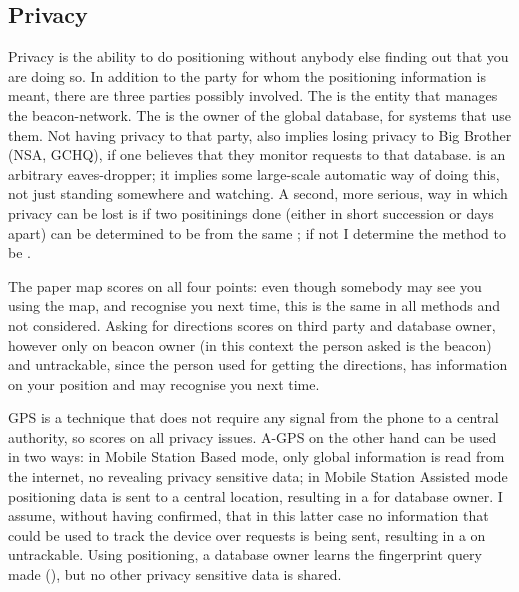 \subsection{Privacy}
Privacy is the ability to do positioning without anybody else finding out that you are doing so.
In addition to the party for whom the positioning information is meant, there are three parties possibly involved.
The  is the entity that manages the beacon-network.
The  is the owner of the global database, for systems that use them.
Not having privacy to that party, also implies losing privacy to Big Brother (NSA, GCHQ), if one believes that they monitor requests to that database.
 is an arbitrary eaves-dropper; it implies some large-scale automatic way of doing this, not just standing somewhere and watching.
A second, more serious, way in which privacy can be lost is if two positinings done (either in short succession or days apart) can be determined to be from the same \device; if not I determine the method to be .

The paper map scores \yes on all four points: even though somebody may see you using the map, and recognise you next time, this is the same in all methods and not considered.
Asking for directions scores \yes on third party and database owner, however only \maybe on beacon owner (in this context the person asked is the beacon) and untrackable, since the person used for getting the directions, has information on your position and may recognise you next time.

GPS is a technique that does not require any signal from the phone to a central authority, so scores \yes on all privacy issues.
A-GPS on the other hand can be used in two ways: in Mobile Station Based mode, only global information is read from the internet, no revealing privacy sensitive data; in Mobile Station Assisted mode positioning data is sent to a central location, resulting in a \maybe for database owner.
I assume, without having confirmed, that in this latter case no information that could be used to track the device over requests is being sent, resulting in a \yes on untrackable.
Using \wifi positioning, a database owner learns the fingerprint query made (\no), but no other privacy sensitive data is shared.

